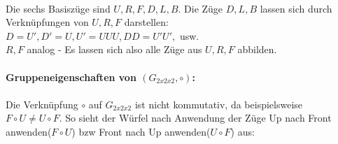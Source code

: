 \documentclass[12pt,a4paper, usenames, dvipsnames]{scrartcl}
\begin{document}
\\
Die sechs Basiszüge sind $U, R, F, D, L, B$. Die Züge $D, L, B$ lassen sich durch Verknüpfungen von $U, R, F$ darstellen: \\ 
$D = U', D' = U, U' = UUU, DD = U'U',$ usw. \\
$R, F$ analog - Es lassen sich also alle Züge aus $U, R, F$ abbilden. \\
\\
\textbf{Gruppeneigenschaften von $(G_{2x2x2}, \circ)$:} \\
\\
Die Verknüpfung $\circ$ auf $G_{2x2x2}$ ist nicht kommutativ, da beispielsweise $F \circ U \neq U \circ F$.
So sieht der Würfel nach Anwendung der Züge \glqq Up nach Front anwenden\grqq ($F \circ U$) bzw \glqq Front nach Up anwenden\grqq ($U \circ F$) aus: \\
\end{document}
